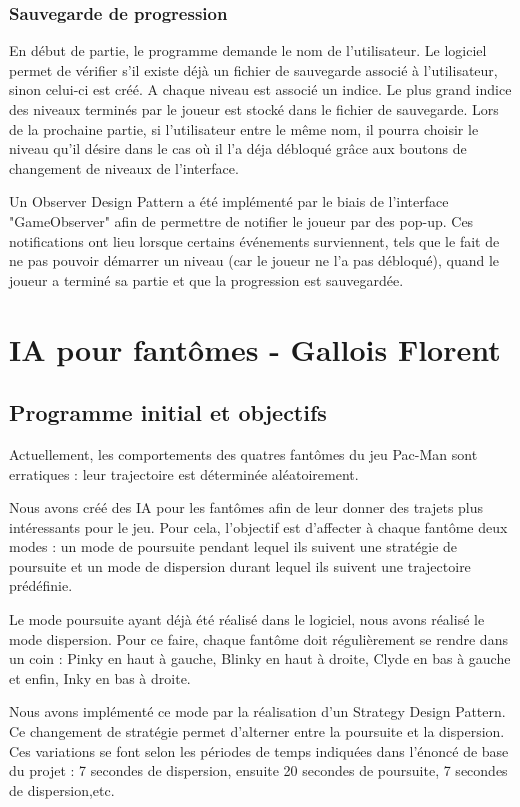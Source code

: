 \documentclass[a4paper,12pt]{report} %
\begin{document}
\subsubsection{Sauvegarde de progression}
En début de partie, le programme demande le nom de l'utilisateur.
Le logiciel permet de vérifier s'il existe déjà un fichier de sauvegarde associé
à l'utilisateur, sinon celui-ci est créé. A chaque niveau est associé un
indice. Le plus grand indice des niveaux terminés par
le joueur est stocké dans le fichier de sauvegarde. Lors de la prochaine partie, si
l'utilisateur entre le même nom, il pourra choisir le niveau qu'il désire dans le cas où il l'a déja débloqué grâce aux boutons de changement
de niveaux de l'interface.


Un Observer Design Pattern a été implémenté par le biais de l'interface
"GameObserver" afin de permettre de notifier le joueur par des pop-up. Ces notifications ont lieu lorsque certains événements surviennent, tels que le fait de ne pas pouvoir démarrer un niveau (car le joueur ne l'a pas débloqué), quand le joueur a terminé sa partie et que la progression est sauvegardée.


\section{IA pour fantômes - Gallois Florent}
\subsection{Programme initial et objectifs}
Actuellement, les comportements des quatres fantômes du jeu Pac-Man sont erratiques : 
leur trajectoire est déterminée aléatoirement.

Nous avons créé des IA pour les fantômes afin de leur donner des trajets plus intéressants pour le jeu.
Pour cela, l'objectif est d'affecter à chaque fantôme deux modes : un mode de poursuite pendant lequel ils suivent une stratégie de poursuite et un mode de dispersion durant lequel ils suivent une trajectoire prédéfinie.

Le mode poursuite ayant déjà été réalisé dans le logiciel, nous avons réalisé le mode dispersion.
Pour ce faire, chaque fantôme doit régulièrement se rendre dans un coin : Pinky en haut à gauche, Blinky en haut à droite, Clyde en bas à gauche et enfin, Inky en bas à droite.

Nous avons implémenté ce mode par la réalisation d'un Strategy Design Pattern.
Ce changement de stratégie permet d'alterner entre la poursuite et la dispersion.
Ces variations se font selon les périodes de temps indiquées dans l'énoncé de base du projet : 7 secondes de dispersion, ensuite 20 secondes de poursuite, 7 secondes de dispersion,etc. 
\end{document}
